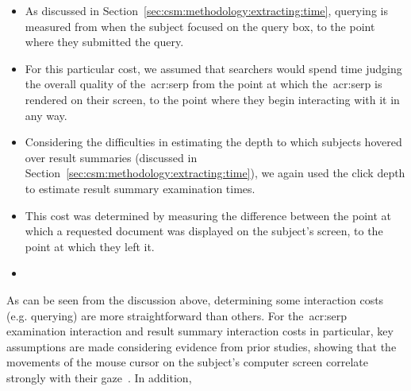 \begin{itemize}
    \item{ As discussed in Section~\ref{sec:csm:methodology:extracting:time}, querying is measured from when the subject focused on the query box, to the point where they submitted the query.}
    \item{ For this particular cost, we assumed that searchers would spend time judging the overall quality of the~\gls{acr:serp} from the point at which the~\gls{acr:serp} is rendered on their screen, to the point where they begin interacting with it in any way.}
    \item{ Considering the difficulties in estimating the depth to which subjects hovered over result summaries (discussed in Section~\ref{sec:csm:methodology:extracting:time}), we again used the click depth to estimate result summary examination times.}
    \item{ This cost was determined by measuring the difference between the point at which a requested document was displayed on the subject's screen, to the point at which they left it.}
    \item{ }
\end{itemize}

As can be seen from the discussion above, determining some interaction costs (e.g. querying) are more straightforward than others. For the~\gls{acr:serp} examination interaction and result summary interaction costs in particular, key assumptions are made considering evidence from prior studies, showing that the movements of the mouse cursor on the subject's computer screen correlate strongly with their gaze~\citep{chen2001mouse_cursor, smucker2014judging_relevance_movements}. In addition, 

